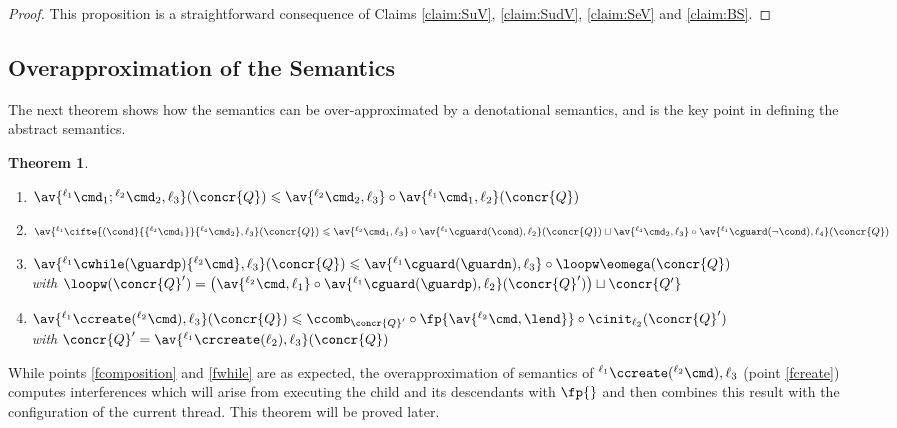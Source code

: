 \documentclass[12pt]{article}
\let\savesqcup\sqcup
\let\sqcup\savesqcup
\newcommand{\li}[1]{ {}^{\ell_{#1}}  }
\newtheorem{theorem}{Theorem}
\begin{document}
\begin{proof}
This proposition is a straightforward consequence of Claims \ref{claim:SuV}, \ref{claim:SudV}, \ref{claim:SeV} and \ref{claim:BS}.
\end{proof}


\subsection{Overapproximation of the \Cname Semantics}

The next theorem shows how the \cname semantics can be over-approximated by a denotational semantics, and is the key point in defining the abstract semantics. 


\begin{theorem}\label{theorem:denot}
\begin{enumerate}[1.\!]
 \item\label{fcomposition}\(\av{\li1\cmd_1;\li2\cmd_2,\ell_3}(\concr{Q}) \leqslant \av{\li2\cmd_2,\ell_3}\circ\av{\li1\cmd_1,\ell_2}(\concr{Q})\) 
\item\label{fif}\(\av{\li1\cifte{(\cond}{\{\li2\cmd_1\}}\{\li4\cmd_2\},\ell_3}(\concr{Q}) 
\leqslant \\
\av{\li2\cmd_1,\ell_3}\circ\av{\li1\cguard(\cond),\ell_2}(\concr{Q}) 
\sqcup
\av{\li4\cmd_2,\ell_3}\circ\av{\li1\cguard(\neg\cond),\ell_4}(\concr{Q}) \)
\item\label{fwhile}\(\av{\li1 \cwhile(\guardp)\{\li2\cmd\},\ell_3 }(\concr{Q})\leqslant \av{\li1 \cguard(\guardn),\ell_3} \circ \loopw\eomega (\concr{Q})\)\\
with \(\loopw(\concr{Q}') = \big( \av{\li2\cmd,\ell_1} \circ 
\av{\li1  \cguard(\guardp),\ell_2} (\concr{Q}') \big) \sqcup \concr{Q'}\)
\item\label{fcreate}\(\av{\li1\ccreate(\li2\cmd),\ell_3}(\concr{Q}) \leqslant  
\ccomb_{\concr{Q}'}\circ\fp{\av{\li2\cmd,\lend}}\circ \cinit_{\ell_2} (\concr{Q}')\)\\
with  \(\concr{Q}' = \av{\li1\crcreate(\ell_2),\ell_3}(\concr{Q})\)
\end{enumerate}
\end{theorem}

While points \ref{fcomposition} and \ref{fwhile} are as expected, the overapproximation of semantics of \(\li1\ccreate(\li2\cmd),\ell_3\) (point \ref{fcreate}) computes interferences which will arise from executing the child and its descendants with \(\fp{}\) and then combines this result with the configuration of the current thread. 
This theorem will be proved later.
\end{document}
